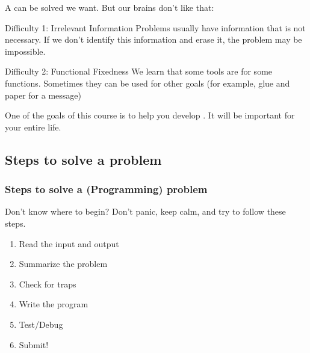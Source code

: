 \documentclass{beamer}
\begin{document}
\begin{frame}
\begin{columns}[T]
  \end{columns}
\end{frame}

\begin{frame}

  A  can be solved  we want. But
  our brains don't like that:

  \begin{exampleblock}{Difficulty 1: Irrelevant Information}
    Problems usually have information that is not necessary. If we
    don't identify this information and erase it, the problem may be
    impossible.
  \end{exampleblock}

  \begin{exampleblock}{Difficulty 2: Functional Fixedness}
    We learn that some tools are for some functions. Sometimes they
    can be used for other goals (for example, glue and paper for a
    message)
  \end{exampleblock}


  \begin{block}{}
    One of the goals of this course is to help you develop
    . It will be important for your
    entire life.
  \end{block}
\end{frame}

\subsection{Steps to solve a problem}
\begin{frame}
  \frametitle{Steps to solve a (Programming) problem} 

  Don't know where to begin?  Don't panic, keep calm, and try to
  follow these steps.

  \begin{enumerate}
  \item Read the input and output
  \item Summarize the problem
  \item Check for traps
  \item Write the program
  \item Test/Debug
  \item Submit!
  \end{enumerate}
\end{frame}
\end{document}
